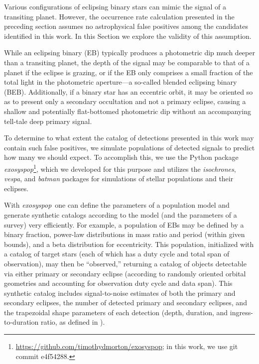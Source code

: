 \documentclass[manuscript, letterpaper]{aastex6}
\makeatletter
\let\origsection\section
\renewcommand\section{\@ifstar{\starsection}{\nostarsection}}
\newcommand\nostarsection[1]{\sectionprelude\origsection{#1}}
\newcommand\starsection[1]{\sectionprelude\origsection*{#1}}
\newcommand\sectionprelude{\vspace{1em}}
\newcommand{\project}[1]{\textsl{#1}}
\newcommand{\exosyspop}{\project{exosyspop}}
\newcommand{\sectlabel}[1]{\label{sect:#1}}
\makeatother
\begin{document}
\section{Astrophysical false positives}\sectlabel{false-positives}


Various configurations of eclipsing binary stars can mimic the signal of a
transiting planet.  However, the occurrence rate calculation
presented in the preceding section assumes no astrophysical false positives
among the candidates identified in this work.  In this Section we explore the
validity of this assumption.

While an eclipsing binary (EB) typically produces a photometric dip much
deeper than a transiting planet, the depth of the signal may be comparable to
that of a planet if the eclipse is grazing, or if the EB only comprises a small
fraction of the total light in the photometric aperture---a so-called blended
eclipsing binary (BEB).  Additionally, if a binary star has an eccentric
orbit, it may be oriented so as to present only a secondary occultation and
not a primary eclipse, causing a shallow and potentially flat-bottomed
photometric dip without an accompanying tell-tale deep primary signal.

To determine to what extent the catalog of detections presented in this work
may contain such false positives, we simulate populations of detected signals
to predict how many we should expect.  To accomplish this, we use the Python
package
\exosyspop\footnote{\url{https://github.com/timothydmorton/exosyspop}; in this
work, we use git commit \textsf{e4f54288}.}, which
we developed for this purpose and utilizes the \project{isochrones}, \project{vespa},
and \project{batman} packages \citep{Morton:2015, Morton:2015b, Kreidberg:2015}
 for simulations of stellar populations and their eclipses.

With \exosyspop\, one can define the parameters of a population model and
generate synthetic catalogs according to the model (and the parameters of a
survey) very efficiently.  For example, a population of EBs may be defined by
a binary fraction, power-law distributions in mass ratio and period (within
given bounds), and a beta distribution for eccentricity.  This population,
initialized with a catalog of target stars (each of which has a duty cycle and
total span of observation), may then be ``observed,'' returning a catalog of
objects detectable via either primary or secondary eclipse (according to
randomly oriented orbital geometries and accounting for observation duty cycle
and data span).  This synthetic catalog includes signal-to-noise estimates of
both the primary and secondary eclipses, the number of detected primary and
secondary eclipses, and the trapezoidal shape parameters of each detection
(depth, duration, and ingress-to-duration ratio, as defined in
\citealt{Morton:2012}).
\end{document}
